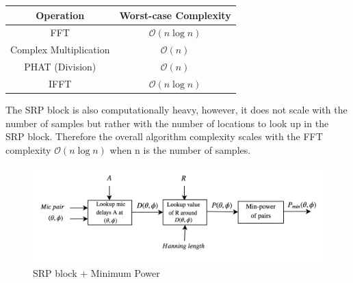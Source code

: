 \begin{center}
  \begin{tabular}{ |c | c | }
    \hline
    Operation  & Worst-case Complexity \\ \hline
    FFT  & $\mathcal{O}(n\log{}n)$  \\ \hline
    Complex Multiplication  & $\mathcal{O}(n)$  \\ \hline
    PHAT (Division)  & $\mathcal{O}(n)$  \\ \hline
    IFFT  & $\mathcal{O}(n\log{}n)$  \\
    \hline
  \end{tabular}
\end{center}
The SRP block is also computationally heavy, however, it does not scale with the number of samples but rather with the number of locations to look up in the SRP block. %
Therefore the overall algorithm complexity scales with the FFT complexity $\mathcal{O}(n\log{}n)$ when n is the number of samples. %
\begin{figure}[!ht]
    \centering
    \includegraphics[width=1\textwidth]{Figures/system2.png}
    \caption{SRP block + Minimum Power}
    \label{fig:system2}
\end{figure}
